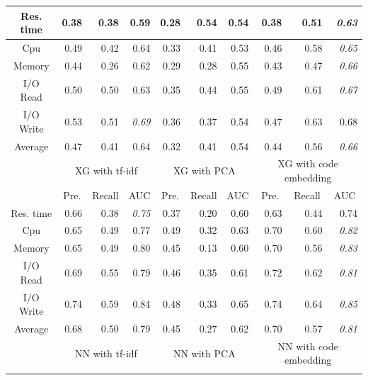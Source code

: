 \documentclass[10pt,journal,compsoc]{IEEEtran}
\begin{document}
\begin{table}
\begin{tabular}{|c|r|r|r|r|r|r|r|r|r|}
Res. time         & 0.38 & 0.38   & 0.59& 0.28 & 0.54   & 0.54& 0.38 & 0.51   & \textit{0.63}            \\ \hline
Cpu               & 0.49 & 0.42   & 0.64& 0.33 & 0.41   & 0.53& 0.46 & 0.58   & \textit{0.65}            \\ \hline
Memory            & 0.44 & 0.26   & 0.62& 0.29 & 0.28   & 0.55& 0.43 & 0.47   & \textit{0.66}            \\ \hline
I/O Read          & 0.50 & 0.50   & 0.63& 0.35 & 0.44   & 0.55& 0.49 & 0.61   & \textit{0.67}            \\ \hline
I/O Write         & 0.53 & 0.51   & \textit{0.69}            & 0.36 & 0.37   & 0.54& 0.47 & 0.63   & 0.68\\ \hline
Average           & 0.47 & 0.41   & 0.64& 0.32 & 0.41   & 0.54& 0.44 & 0.56   & \textit{0.66}            \\ \hline
\multirow{2}{*}{} & \multicolumn{3}{c|}{XG with tf-idf}      & \multicolumn{3}{c|}{XG with PCA}         & \multicolumn{3}{c|}{XG with code embedding}                   \\ \cline{2-10} 
                  & \multicolumn{1}{c|}{Pre.} & \multicolumn{1}{c|}{Recall} & \multicolumn{1}{c|}{AUC} & \multicolumn{1}{c|}{Pre.} & \multicolumn{1}{c|}{Recall} & \multicolumn{1}{c|}{AUC} & \multicolumn{1}{c|}{Pre.} & \multicolumn{1}{c|}{Recall} & \multicolumn{1}{c|}{AUC} \\ \hline
Res. time         & 0.66 & 0.38   & \textit{0.75}            & 0.37 & 0.20   & 0.60& 0.63 & 0.44   & 0.74\\ \hline
Cpu               & 0.65 & 0.49   & 0.77& 0.49 & 0.32   & 0.63& 0.70 & 0.60   & \textit{0.82}            \\ \hline
Memory            & 0.65 & 0.49   & 0.80& 0.45 & 0.13   & 0.60& 0.70 & 0.56   & \textit{0.83}            \\ \hline
I/O Read          & 0.69 & 0.55   & 0.79& 0.46 & 0.35   & 0.61& 0.72 & 0.62   & \textit{0.81}            \\ \hline
I/O Write         & 0.74 & 0.59   & 0.84& 0.48 & 0.33   & 0.65& 0.74 & 0.64   & \textit{0.85}            \\ \hline
Average           & 0.68 & 0.50   & 0.79& 0.45 & 0.27   & 0.62& 0.70 & 0.57   & \textit{0.81}            \\ \hline
\multirow{2}{*}{} & \multicolumn{3}{c|}{NN with tf-idf}      & \multicolumn{3}{c|}{NN with PCA}         & \multicolumn{3}{c|}{NN with code embedding}                   \\ \cline{2-10} 

\end{tabular}
\end{table}
\end{document}
